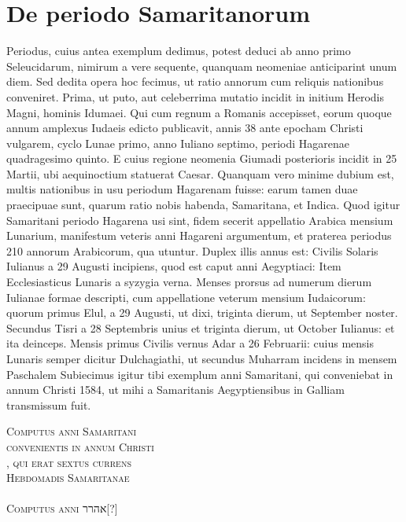 \section{De periodo Samaritanorum}
Periodus, cuius antea exemplum dedimus, potest deduci ab
anno primo Seleucidarum, nimirum a vere sequente, quanquam
neomeniae anticiparint unum diem.
Sed dedita opera hoc fecimus,
ut ratio annorum cum reliquis nationibus conveniret.
Prima,
ut puto, aut celeberrima mutatio incidit in initium Herodis
Magni, hominis Idumaei.
Qui cum regnum a Romanis accepisset, eorum
quoque annum amplexus Iudaeis edicto publicavit, annis 38
ante epocham Christi vulgarem, cyclo Lunae primo, anno Iuliano
septimo, periodi Hagarenae quadragesimo quinto.
E cuius regione
neomenia Giumadi posterioris incidit in 25 Martii, ubi aequinoctium
statuerat Caesar.
Quanquam vero minime dubium est, multis
nationibus in usu periodum Hagarenam fuisse: earum tamen duae praecipuae
sunt, quarum ratio nobis habenda, Samaritana, et Indica.
Quod
igitur Samaritani periodo Hagarena usi sint, fidem secerit appellatio
Arabica mensium Lunarium, manifestum veteris anni Hagareni argumentum,
et praterea periodus 210 annorum Arabicorum, qua
utuntur.
Duplex illis annus est: Civilis Solaris Iulianus a 29 Augusti
incipiens, quod est caput anni Aegyptiaci: Item Ecclesiasticus
Lunaris a syzygia verna.
Menses prorsus ad numerum dierum Iulianae
formae descripti, cum appellatione veterum mensium Iudaicorum:
quorum primus Elul, a 29 Augusti, ut dixi, triginta dierum, ut September
noster. %
Secundus Tisri a 28 Septembris unius et triginta dierum,
ut October Iulianus: et ita deinceps.
Mensis primus Civilis
vernus Adar a 26 Februarii: cuius mensis Lunaris semper dicitur
Dulchagiathi, ut secundus Muharram incidens in mensem Paschalem
Subiecimus igitur tibi exemplum anni Samaritani, qui conveniebat
in annum Christi 1584, ut mihi a Samaritanis Aegyptiensibus in
Galliam transmissum fuit.

\begin{center}
\huge\textsc{Computus anni Samaritani}\\
\Large\textsc{convenientis in annum Christi}\\
\large{}\textsc{, qui erat sextus currens}\\
\large\textsc{Hebdomadis Samaritanae}\\
~\\
\large\textsc{Computus anni} \texthebrew{אהרר}[?]\\
\end{center}

